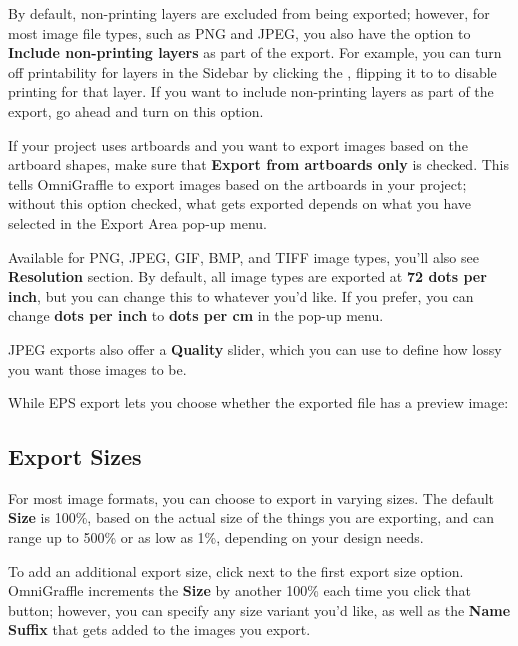 \documentclass[../main.tex]{subfiles}
\begin{document}
By default, non-printing layers are excluded from being exported; however, for most image file
types, such as PNG and JPEG, you also have the option to \textbf{Include non-printing layers}
as part of the export. For example, you can turn off printability for layers in the Sidebar by
clicking the , flipping it to
 to disable printing for that layer. If you
want to include non-printing layers as part of the export, go ahead and turn on this option.

If your project uses artboards and you want to export images based on the artboard shapes, make
sure that \textbf{Export from artboards only} is checked. This tells OmniGraffle to export
images based on the artboards in your project; without this option checked, what gets exported
depends on what you have selected in the Export Area pop-up menu.

Available for PNG, JPEG, GIF, BMP, and TIFF image types, you'll also see \textbf{Resolution}
section. By default, all image types are exported at \textbf{72 dots per inch}, but you can
change this to whatever you'd like. If you prefer, you can change \textbf{dots per inch} to
\textbf{dots per cm} in the pop-up menu.

JPEG exports also offer a \textbf{Quality} slider, which you can use to define how lossy you
want those images to be.


While EPS export lets you choose whether the exported file has a preview image:


\subsection{Export Sizes}

For most image formats, you can choose to export in varying sizes. The default \textbf{Size} is
100\%, based on the actual size of the things you are exporting, and can range up to 500\% or
as low as 1\%, depending on your design needs.


To add an additional export size, click  next
to the first export size option. OmniGraffle increments the \textbf{Size} by another 100\%
each time you click that button; however, you can specify any size variant you'd like, as well
as the \textbf{Name Suffix} that gets added to the images you export.
\end{document}
